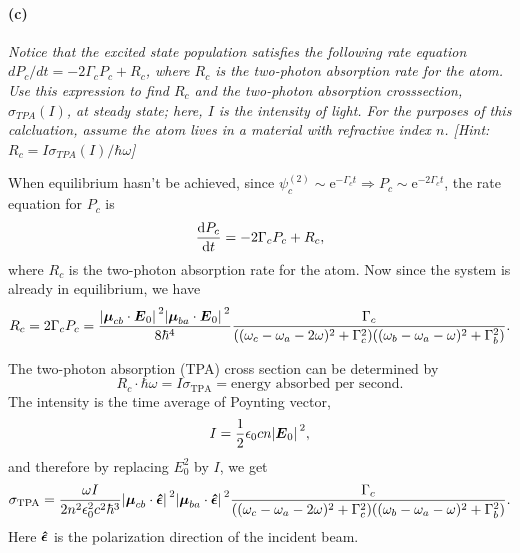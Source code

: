 \documentclass[hyperref, a4paper]{article}
\newcommand*{\ee}{\mathrm{e}}
\begin{document}
\paragraph*{(c)} \textit{
    Notice that the excited state population satisfies the following rate equation $d P_c / d t=-2 \Gamma_c P_c+R_c$, where $R_c$ is the two-photon absorption rate for the atom. Use this expression to find $R_c$ and the two-photon absorption crosssection, $\sigma_{T P A}(I)$, at steady state; here, $I$ is the intensity of light. For the purposes of this calcluation, assume the atom lives in a material with refractive index $n$. [Hint: $R_c=I \sigma_{T P A}(I) / \hbar \omega$]
}

When equilibrium hasn't be achieved, since $\psi_c^{(2)} \sim \ee^{- \Gamma_c t} \Rightarrow 
P_c \sim \ee^{- 2 \Gamma_c t}$, the rate equation for $P_c$ is 
\begin{equation}
    \dv{P_c}{t} = - 2 \Gamma_c P_c + R_c,
\end{equation}
where $R_c$ is the two-photon absorption rate for the atom. 
Now since the system is already in equilibrium, 
we have 
\begin{equation}
    R_c = 2 \Gamma_c P_c 
    = \frac{
        \abs*{\vb*{\mu}_{cb} \cdot \vb*{E}_0}^2 
        \abs*{\vb*{\mu}_{ba} \cdot \vb*{E}_0}^2
    }{8 \hbar^4} 
    \frac{\Gamma_c}{
        ((\omega_c - \omega_a - 2 \omega)^2 + \Gamma_c^2 )
        ((\omega_b - \omega_a - \omega)^2 + \Gamma_b^2)
    }.
\end{equation} 

The two-photon absorption (TPA) cross section can be determined by 
\begin{equation}
    R_c \cdot \hbar \omega = I \sigma_{\text{TPA}} = \text{energy absorbed per second}.
\end{equation}
The intensity is the time average of Poynting vector, 
\begin{equation}
    I = \frac{1}{2} \epsilon_0 c n \abs*{\vb*{E}_0}^2,
\end{equation}
and therefore by replacing $E_0^2$ by $I$, we get 
\begin{equation}
    \sigma_{\text{TPA}} = \frac{\omega I}{2 n^2 \epsilon_0^2 c^2 \hbar^3} 
    \abs*{\vb*{\mu}_{cb} \cdot \vu*{\epsilon}}^2 
    \abs*{\vb*{\mu}_{ba} \cdot \vu*{\epsilon}}^2
    \frac{\Gamma_c}{
        ((\omega_c - \omega_a - 2 \omega)^2 + \Gamma_c^2 )
        ((\omega_b - \omega_a - \omega)^2 + \Gamma_b^2)
    }.
\end{equation}
Here $\vu*{\epsilon}$ is the polarization direction of the incident beam.
\end{document}

